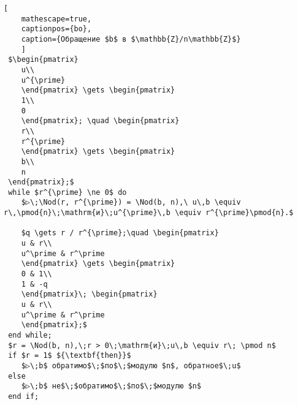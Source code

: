 \documentclass{../../template/mai_book}
\begin{document}
    \setcounter{lstlisting}{0}
    \begin{center}
    \begin{minipage}{0.85\textwidth}
    \begin{lstlisting}[
    mathescape=true,
    captionpos={bo},
    caption={Обращение $b$ в $\mathbb{Z}/n\mathbb{Z}$}
    ]
 $\begin{pmatrix}
    u\\
    u^{\prime}
    \end{pmatrix} \gets \begin{pmatrix}
    1\\
    0
    \end{pmatrix}; \quad \begin{pmatrix}
    r\\
    r^{\prime}
    \end{pmatrix} \gets \begin{pmatrix}
    b\\
    n
 \end{pmatrix};$
 while $r^{\prime} \ne 0$ do
    $▷\;\Nod(r, r^{\prime}) = \Nod(b, n),\ u\,b \equiv r\,\pmod{n}\;\mathrm{и}\;u^{\prime}\,b \equiv r^{\prime}\pmod{n}.$

    $q \gets r / r^{\prime};\quad \begin{pmatrix}
    u & r\\
    u^\prime & r^\prime
    \end{pmatrix} \gets \begin{pmatrix}
    0 & 1\\
    1 & -q
    \end{pmatrix}\; \begin{pmatrix}
    u & r\\
    u^\prime & r^\prime
    \end{pmatrix};$
 end while;
 $r = \Nod(b, n),\;r > 0\;\mathrm{и}\;u\,b \equiv r\; \pmod n$
 if $r = 1$ ${\textbf{then}}$
    $▷\;b$ обратимо$\;$по$\;$модулю $n$, обратное$\;u$
 else
    $▷\;b$ не$\;$обратимо$\;$по$\;$модулю $n$
 end if;
    \end{lstlisting}
    \end{minipage}
    \end{center}
\end{document}
